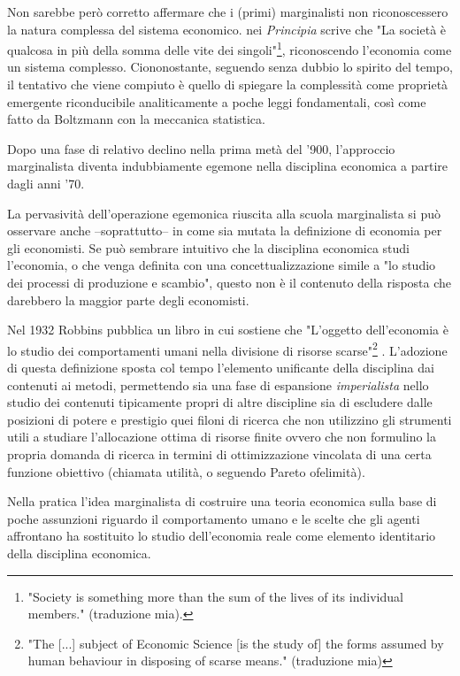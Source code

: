 \documentclass[a4paper, headings=standardclasses]{scrartcl}
\begin{document}
Non sarebbe però corretto affermare che i (primi) marginalisti non riconoscessero la natura complessa del sistema economico.
\textcite[p. 20]{marshall1988} nei \textit{Principia} scrive che "La società è qualcosa in più della somma delle vite dei singoli"\footnote{"Society is something more than the sum of the lives of its individual members." (traduzione mia).}, riconoscendo l'economia come un sistema complesso.
Ciononostante, seguendo senza dubbio lo spirito del tempo, il tentativo che viene compiuto è quello di spiegare la complessità come proprietà emergente riconducibile analiticamente a poche leggi fondamentali, così come fatto da Boltzmann con la meccanica statistica.

Dopo una fase di relativo declino nella prima metà del '900, l'approccio marginalista diventa indubbiamente egemone nella disciplina economica a partire dagli anni '70.

La pervasività dell'operazione egemonica riuscita alla scuola marginalista si può osservare anche --soprattutto-- in come sia mutata la definizione di economia per gli economisti.
Se può sembrare intuitivo che la disciplina economica studi l'economia, o che venga definita con una concettualizzazione simile a "lo studio dei processi di produzione e scambio", questo non è il contenuto della risposta che darebbero la maggior parte degli economisti.

Nel 1932 Robbins pubblica un libro in cui sostiene che "L'oggetto dell'economia è lo studio dei comportamenti umani nella divisione di risorse scarse"\footnote{"The [...] subject of Economic Science [is the study of] the forms assumed by human behaviour in disposing of scarse means." (traduzione mia)} \parencite[p. 15]{robbins2007}.
L'adozione di questa definizione sposta col tempo l'elemento unificante della disciplina dai contenuti ai metodi, permettendo sia una fase di espansione \textit{imperialista} nello studio dei contenuti tipicamente propri di altre discipline \parencite[cfr.][]{stigler1984, lazear2000} sia di escludere dalle posizioni di potere e prestigio quei filoni di ricerca che non utilizzino gli strumenti utili a studiare l'allocazione ottima di risorse finite ovvero che non formulino la propria domanda di ricerca in termini di ottimizzazione vincolata di una certa funzione obiettivo (chiamata utilità, o seguendo Pareto ofelimità).

Nella pratica l'idea marginalista di costruire una teoria economica sulla base di poche assunzioni riguardo il comportamento umano e le scelte che gli agenti affrontano ha sostituito lo studio dell'economia reale come elemento identitario della disciplina economica.
\end{document}
